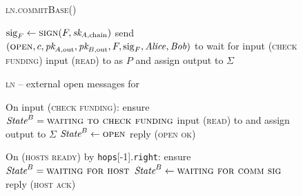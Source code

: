 \begin{figure}[H]
  \begin{processbox}{\textsc{ln.commitBase}()}
    \begin{algorithmic}[1]
      \State $\mathrm{sig}_F \gets \textsc{sign}(F, \textit{sk}_{A, \mathrm{chain}})$
      \label{code:ln:base:sign-funding}
      \State send $(\textsc{open}, c, \textit{pk}_{A, \mathrm{out}}, \textit{pk}_{B,
      \mathrm{out}}, F, \mathrm{sig}_F, \mathit{Alice}, \mathit{Bob})$ to \adversary
        \State wait for input (\textsc{check funding}) 
        \State input (\textsc{read}) to \ledger as $P$ and assign output to
        $\Sigma$
      \EndWhile
    \end{algorithmic}
  \end{processbox}
  \caption{}
  \label{code:ln:commit-base}
\end{figure}

\begin{figure}[H]
  \begin{processbox}{\textsc{ln} -- external open messages for \bob}
    \begin{algorithmic}[1]
      \State On input (\textsc{check funding}): 
      \Indent
        \State ensure $\textit{State}^B = \textsc{waiting to check funding}$
        \State input (\textsc{read}) to \ledger and assign output to $\Sigma$
          \State $\textit{State}^B \gets \textsc{open}$
          \State reply (\textsc{open ok})
        \EndIf
      \EndIndent
      \Statex

      \State On (\textsc{hosts ready}) by \texttt{hops}[-1].\texttt{right}:
      \Indent
        \State ensure $\textit{State}^B = \textsc{waiting for host}$
        \State $\textit{State}^B \gets \textsc{waiting for comm sig}$
        \label{code:ln:bob:host}
        \State reply (\textsc{host ack})
      \EndIndent
    \end{algorithmic}
  \end{processbox}
  \caption{}
  \label{code:ln:bob}
\end{figure}

